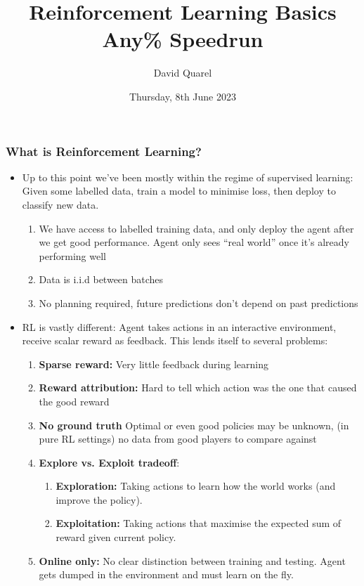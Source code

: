 \documentclass[10pt,a4paper, handout]{beamer}
\begin{document}
\title[Reinforcement Learning Basics Any\% Speedrun] %
{Reinforcement Learning Basics Any\% Speedrun }

 
\author[David Quarel] %
{David Quarel}
 
 
\date[8th June 2023] %
{Thursday, 8th June 2023}
 
\frame{\titlepage}

\begin{frame}
\frametitle{What is Reinforcement Learning?}
\begin{itemize}
	\item Up to this point we've been mostly within the regime of 
	supervised learning: Given some labelled data, train a model to
	minimise loss, then deploy to classify new data.
	\begin{enumerate}
		\pause 
		\item We have access to labelled training data, and only deploy
		the agent after we get good performance. Agent only sees 
		``real world'' once it's already performing well
		\pause 
		\item Data is i.i.d between batches
		\pause 
		\item No planning required, future predictions don't depend on past
		predictions
		\pause
	\end{enumerate}  
	\item RL is vastly different: Agent takes actions in an interactive environment,
	receive scalar reward as feedback. This lends itself to several problems:
	\pause
	\begin{enumerate}
		\item  \textbf{Sparse reward:} Very little feedback during learning 
		\pause
		\item \textbf{Reward attribution:} Hard to tell which action
		was the one that caused the good reward
		\pause
		\item \textbf{No ground truth} Optimal or even good policies
		may be unknown, (in pure RL settings) no data from good players to compare against
		\pause
		\item \textbf{Explore vs. Exploit tradeoff}: 
		\begin{enumerate}
			\item \textbf{Exploration:} Taking actions to learn how the 
			world works (and improve the policy).
			\item \textbf{Exploitation:} Taking actions that maximise the expected sum of reward given current policy.
		\end{enumerate}
	\pause 
	\item \textbf{Online only:} No clear distinction between training and testing.
	Agent gets dumped in the environment and must learn on the fly. 
	\end{enumerate} 
\end{itemize}
	
\end{frame}
\end{document}
